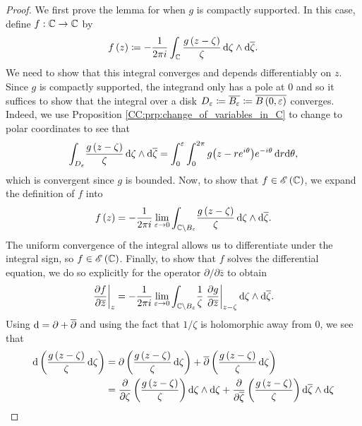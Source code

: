 \documentclass[../Moduli_Spaces_of_Riemann_Surfaces.tex]{subfiles}
\begin{document}
    \begin{proof}
        We first prove the lemma for when $g$ is compactly supported. In this case, define $f:\mathbb{C}\to\mathbb{C}$ by
        \begin{equation*}
            f\left(z\right)\coloneqq-\frac{1}{2\pi i}\int_{\mathbb{C}}\frac{g\left(z-\zeta\right)}{\zeta}\,\mathrm{d}\zeta\wedge\mathrm{d}\overline{\zeta}.
        \end{equation*}
        We need to show that this integral converges and depends differentiably on $z$. Since $g$ is compactly supported, the integrand only has a pole at $0$ and so it suffices to show that the integral over a disk $D_\varepsilon\coloneqq\overline{B_\varepsilon}\coloneqq\overline{B\left(0,\varepsilon\right)}$ converges. Indeed, we use Proposition \ref{CC:prp:change_of_variables_in_C} to change to polar coordinates to see that
        \begin{equation*}
            \int_{ D_\varepsilon}\!\frac{g\left(z-\zeta\right)}{\zeta}\,\mathrm{d}\zeta\wedge\mathrm{d}\overline{\zeta}=\int_{0}^{\varepsilon}\int_{0}^{2\pi}g\big(z-re^{i\theta}\big)e^{-i\theta}\,\mathrm{d} r\mathrm{d}\theta,
        \end{equation*}
        which is convergent since $g$ is bounded. Now, to show that $f\in\mathscr{E}\left(\mathbb{C}\right)$, we expand the definition of $f$ into
        \begin{equation*}
            f\left(z\right)=-\frac{1}{2\pi i}\lim\limits_{\varepsilon\to0}\int_{\mathbb{C}\setminus B_\varepsilon}\!\frac{g\left(z-\zeta\right)}{\zeta}\,\mathrm{d}\zeta\wedge\mathrm{d}\overline{\zeta}.
        \end{equation*}
        The uniform convergence of the integral allows us to differentiate under the integral sign, so $f\in\mathscr{E}\left(\mathbb{C}\right)$. Finally, to show that $f$ solves the differential equation, we do so explicitly for the operator $\partial/\partial\bar{z}$ to obtain
        \begin{equation*}
            \left.\frac{\partial f}{\partial\overline{z}}\right|_z=-\frac{1}{2\pi i}\lim\limits_{\varepsilon\to0}\int_{\mathbb{C}\setminus B_\varepsilon}\!\frac{1}{\zeta}\left.\frac{\partial g}{\partial\overline{z}}\right|_{z-\zeta}\mathrm{d}\zeta\wedge\mathrm{d}\overline{\zeta}.
        \end{equation*}
        Using $\mathrm{d}=\partial+\overline{\partial}$ and using the fact that $1/\zeta$ is holomorphic away from $0$, we see that
        \begin{equation*}
            \begin{aligned}
                \d\l(\frac{g\l(z-\zeta\r)}{\zeta}\,\d\zeta\r)&=\partial\l(\frac{g\l(z-\zeta\r)}{\zeta}\,\d\zeta\r)+\bar{\partial}\l(\frac{g\l(z-\zeta\r)}{\zeta}\,\d\zeta\r) \\
                   &=\frac{\partial}{\partial\zeta}\l(\frac{g\l(z-\zeta\r)}{\zeta}\r)\d\zeta\wedge\d\zeta+\frac{\partial}{\partial\bar{\zeta}}\l(\frac{g\l(z-\zeta\r)}{\zeta}\r)\d\bar{\zeta}\wedge\d\zeta \\

\end{aligned}
\end{equation*}
\end{proof}
\end{document}
